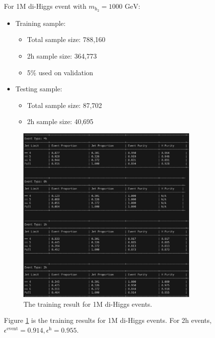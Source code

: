 \documentclass[12pt]{article}
\begin{document}
		For 1M di-Higgs event with $m_{\text{h}_2} = \text{1000 GeV}$:
		\begin{itemize}
			\item Training sample:
			\begin{itemize}
				\item Total sample size: 788,160
				\item 2h sample size: 364,773
				\item 5\% used on validation
			\end{itemize}
			\item Testing sample: 
				\begin{itemize}
					\item Total sample size: 87,702
					\item 2h sample size: 40,695
				\end{itemize}
		\end{itemize}
		\begin{figure}[htpb]
			\centering
			\includegraphics[width=0.8\textwidth]{1M_diHiggs.png}
			\caption{The training result for 1M di-Higgs events.}
			\label{fig:1M_diHiggs_result}
		\end{figure}

		Figure \ref{fig:1M_diHiggs_result} is the training results for 1M di-Higgs events. For 2h events, $\epsilon^{\text{event}} = 0.914, \epsilon^{\text{h}} = 0.955$.
\end{document}
